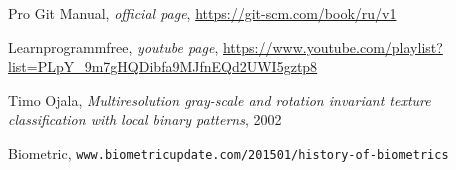 \begin{thebibliography}{99999}
\singlespace\normalsize

 Pro Git Manual, \textit{ official page}, \url{https://git-scm.com/book/ru/v1}

 Learnprogrammfree, \textit{youtube page}, \url{https://www.youtube.com/playlist?list=PLpY_9m7gHQDibfa9MJfnEQd2UWI5gztp8}



 Timo Ojala, \textit{Multiresolution gray-scale and rotation invariant texture classification with local binary patterns}, 2002

 Biometric, \texttt{www.biometricupdate.com/201501/history-of-biometrics}


\end{thebibliography}
